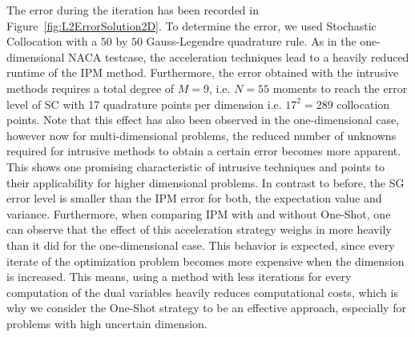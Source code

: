 The error during the iteration has been recorded in Figure~\ref{fig:L2ErrorSolution2D}. To determine the error, we used Stochastic Collocation with a $50$ by $50$ Gauss-Legendre quadrature rule. As in the one-dimensional NACA testcase, the acceleration techniques lead to a heavily reduced runtime of the IPM method. Furthermore, the error obtained with the intrusive methods requires a total degree of $M = 9$, i.e. $N = 55$ moments to reach the error level of SC with 17 quadrature points per dimension i.e. $17^2 = 289$ collocation points. Note that this effect has also been observed in the one-dimensional case, however now for multi-dimensional problems, the reduced number of unknowns required for intrusive methods to obtain a certain error becomes more apparent. This shows one promising characteristic of intrusive techniques and points to their applicability for higher dimensional problems. In contrast to before, the SG error level is smaller than the IPM error for both, the expectation value and variance. Furthermore, when comparing IPM with and without One-Shot, one can observe that the effect of this acceleration strategy weighs in more heavily than it did for the one-dimensional case. This behavior is expected, since every iterate of the optimization problem becomes more expensive when the dimension is increased. This means, using a method with less iterations for every computation of the dual variables heavily reduces computational costs, which is why we consider the One-Shot strategy to be an effective approach, especially for problems with high uncertain dimension.
